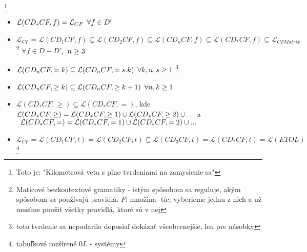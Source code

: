 \begin{veta}\footnote{Toto je: "Kilometrová veta s plno tvrdeniami na zamyslenie sa"}
\begin{itemize}
\item $\mathcal{L}(CD_*CF,f) = \mathcal{L}_{CF} \enspace \forall f \in D'$
\item $\mathcal{L}_{CF} = \mathcal{L}(CD_1CF,f) \varsubsetneq \mathcal{L}(CD_2CF,f)
\subseteq \mathcal{L}(CD_nCF,f) \subseteq \mathcal{L}(CD_*CF,f) \subseteq
\mathcal{L}_{CFMatrix}$\footnote{Maticové bezkontextové gramatiky - istým spôsobom sa
reguluje, akým spôsobom sa používajú pravidlá. $P$: množina -tíc; vyberieme jednu z nich
a už musíme použiť všetky pravidlá, ktoré sú v nej} $\forall f \in D-D'$,$\enspace n\geq 3$
\item $\mathcal{L}(CD_nCF,=k)\subseteq \mathcal{L}(CD_nCF,=s.k)\enspace \forall k,n,s\geq 1$
\footnote{toto tvrdenie sa nepodarilo doposiaľ dokázať všeobecnejšie, len pre násobky}
\item $\mathcal{L}(CD_nCF,\geq k)\subseteq \mathcal{L}(CD_nCF,\geq k+1)\enspace \forall n,k\geq 1$
\item $\mathcal{L}(CD_*CF,\geq)\subseteq \mathcal{L}(CD_*CF,=)$, kde
$\mathcal{L}(CD_*CF,\geq) = \mathcal{L}(CD_*CF,\geq 1)\cup \mathcal{L}(CD_*CF,\geq 2)\cup
...\enspace$a$\enspace \mathcal{L}(CD_*CF,=) = \mathcal{L}(CD_*CF,= 1)\cup \mathcal{L}(CD_*CF,=2)
\cup ...$
\item $\mathcal{L}_{CF}=\mathcal{L}(CD_1CF,t)=\mathcal{L}(CD_2CF,t)\varsubsetneq
\mathcal{L}(CD_3CF,t)=\mathcal{L}(CD_*CF,t)=\mathcal{L}(ETOL)$\footnote{tabuľkové
rozšírené $0L$ - systémy}
\end{itemize}
\end{veta}

